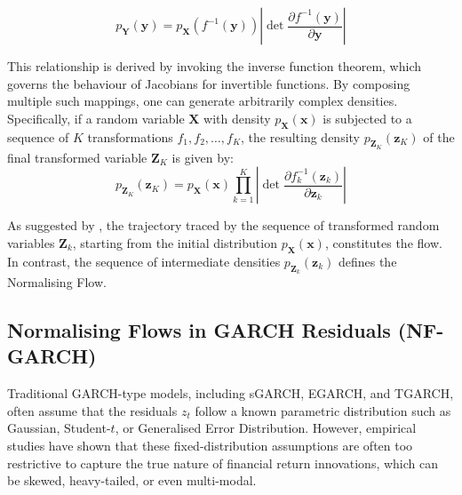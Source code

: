 \documentclass[oneside,12pt]{CUEDthesisPSnPDF}
\newcommand{\textcite}{\citet}
\begin{document}
\begin{equation}
p_\mathbf{Y}(\mathbf{y}) = p_\mathbf{X}\left(f^{-1}(\mathbf{y})\right) \left|\det \frac{\partial f^{-1}(\mathbf{y})}{\partial \mathbf{y}}\right|
\end{equation}

\vspace{15pt}

This relationship is derived by invoking the inverse function theorem, which governs the behaviour of Jacobians for invertible functions. By composing multiple such mappings, one can generate arbitrarily complex densities. Specifically, if a random variable \(\mathbf{X}\) with density \(p_\mathbf{X}(\mathbf{x})\) is subjected to a sequence of \(K\) transformations \(f_1, f_2, \dots, f_K\), the resulting density \(p_{\mathbf{Z}_K}(\mathbf{z}_K)\) of the final transformed variable \(\mathbf{Z}_K\) is given by:\\

\begin{equation}
p_{\mathbf{Z}_K}(\mathbf{z}_K) = p_\mathbf{X}(\mathbf{x}) \prod_{k=1}^{K} \left|\det \frac{\partial f_k^{-1}(\mathbf{z}_k)}{\partial \mathbf{z}_k}\right|
\end{equation}

\vspace{15pt}

As suggested by \textcite{kobyzev2020normalising}, the trajectory traced by the sequence of transformed random variables \(\mathbf{Z}_k\), starting from the initial distribution \(p_\mathbf{X}(\mathbf{x})\), constitutes the flow. In contrast, the sequence of intermediate densities \(p_{\mathbf{Z}_k}(\mathbf{z}_k)\) defines the Normalising Flow.\\


\subsection{Normalising Flows in GARCH Residuals (NF-GARCH)}
\noindent 
Traditional GARCH-type models, including sGARCH, EGARCH, and TGARCH, often assume that the residuals \( z_t \) follow a known parametric distribution such as Gaussian, Student-\( t \), or Generalised Error Distribution. However, empirical studies have shown that these fixed-distribution assumptions are often too restrictive to capture the true nature of financial return innovations, which can be skewed, heavy-tailed, or even multi-modal.\\
\end{document}

